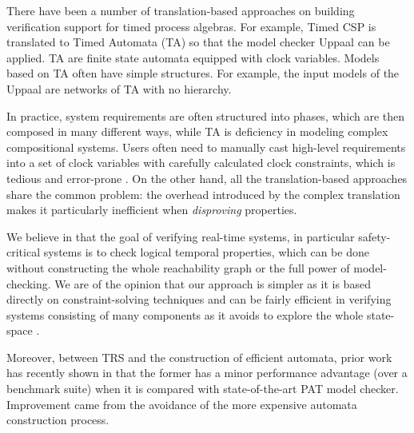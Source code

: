 \documentclass[acmsmall,10pt,review]{acmart}
\newcommand{\code}[1]{{\tt{\ensuremath{\m{#1}}}}}
\newcommand{\m}{\mathit}
\begin{document}
{{{%


There have been a number of translation-based approaches on building verification support for timed process algebras. For example, Timed CSP \cite{DBLP:journals/tse/DongHQSY08} is translated to Timed Automata (TA) so that the model checker Uppaal can be \cite{DBLP:journals/sttt/LarsenPY97} applied. 
TA are finite state automata equipped with clock variables. Models based on TA often have simple structures. For example, the input models of the Uppaal are networks of TA with no hierarchy. 


In practice, system requirements are often structured into phases, which are then composed in many different ways, while TA is deficiency in modeling complex compositional systems. Users often need to manually cast high-level requirements into a set of clock variables with carefully calculated clock constraints, which is tedious and error-prone \cite{DBLP:journals/tosem/00010DLSA13}. 
On the other hand, all the translation-based approaches share the common problem: 
the overhead introduced by
the complex translation makes it particularly inefficient when \emph{disproving} properties. 

We believe in that the goal of verifying real-time systems, in particular 
safety-critical systems is to check logical temporal properties, which can 
be done without constructing the whole reachability graph or the full power 
of model-checking. We are of the opinion that our approach is simpler as 
it is based directly on constraint-solving techniques and can be fairly 
efficient in verifying systems consisting of many components as it avoids 
to explore the whole state-space \cite{DBLP:conf/icfem/SongC20,DBLP:conf/forte/YiPD94}.


 
Moreover, between TRS and the construction of efficient automata, prior work has recently shown in \cite{DBLP:conf/icfem/SongC20} that the former has a minor performance advantage (over a benchmark suite) when it is compared with state-of-the-art PAT \cite{DBLP:conf/cav/SunLDP09} model checker.
Improvement came from the avoidance of the more expensive automata construction process.



}}}
\end{document}
